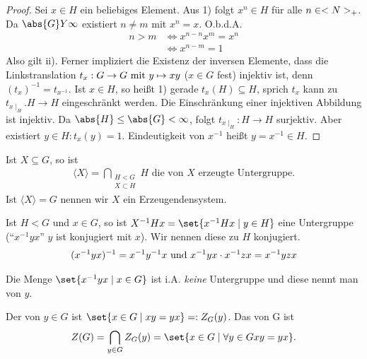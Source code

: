 \begin{proof}
	Sei $x \in H$ ein beliebiges Element. Aus 1) folgt $x^n \in H$ für alle $n \in \N_{+}$. Da $\abs{G}Y \infty$ existiert $n\neq m$ mit $x^n = x$. O.b.d.A.
	\begin{align*}
		 n > m &\Longleftrightarrow x^{n-n} x^m = x^n\\
		 &\Longleftrightarrow x^{n-m} = 1
	\end{align*}
	Also gilt ii). Ferner impliziert die Existenz der inversen Elemente, dass die Linkstranslation $t_x: G \to G \mit y \mapsto xy$ ($x \in G$ fest) injektiv ist, denn $(t_x)^{-1} = t_{x^{-1}}$. Ist $x \in H$, so heißt 1) gerade $t_x(H) \subseteq H$, sprich $t_x$ kann zu $t_{x\mid_H}. H \to H$ eingeschränkt werden. Die Einschränkung einer injektiven Abbildung ist injektiv. Da $\abs{H} \le \abs{G} < \infty$, folgt $t_{x\mid_H}: H \to H$ surjektiv. Aber existiert $y \in H: t_x(y)= 1$. Eindeutigkeit von $x^{-1}$ heißt $y = x^{-1} \in H$.
\end{proof}
\begin{definition}[Erzeugendensystem]
	Ist $X \subseteq G$, so ist
	\begin{align*}
		\langle X \rangle = \bigcap_{\substack{H < G\\X \subset H}} H \text{ die von $X$ erzeugte Untergruppe}.
	\end{align*}
	Ist $\langle X \rangle = G$ nennen wir $X$ ein Erzeugendensystem.
\end{definition}
\begin{definition}[Konjugation]
	Ist $H < G$ und $x \in G$, so ist $X^{-1}Hx = \set{x^{-1}Hx\mid y \in H}$ eine Untergruppe (``$x^{-1}yx$'' $y$ ist konjugiert mit $x$). Wir nennen diese zu $H$ konjugiert.
	\begin{align*}
		(x^{-1}yx)^{-1} = x^{-1}y^{-1}x \und x^{-1}yx\cdot x^{-1}zx = x^{-1}yzx
	\end{align*}
\end{definition}
\begin{definition}[Konjugationsklasse]
	Die Menge $\set{x^{-1}yx \mid x \in G}$ ist i.A. \emph{keine} Untergruppe und diese nennt man  von $y$.
\end{definition}
\begin{definition}
	Der  von $y \in G$ ist $\set{x \in G \mid xy = yx} =: Z_G(y)$. Das  von G ist
	\begin{align*}
		Z(G) = \bigcap_{y \in G} Z_G(y) = \set{x \in G \mid \forall y \in G xy=yx}.
	\end{align*}
\end{definition}
